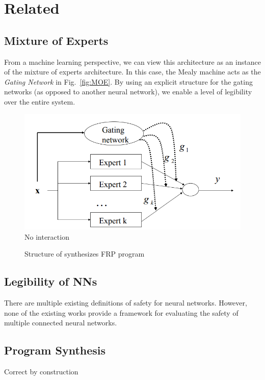 \section{Related}

\subsection{Mixture of Experts}

From a machine learning perspective, we can view this architecture as an instance of the mixture of experts architecture.
In this case, the Mealy machine acts as the \textit{Gating Network} in Fig.~\ref{fig:MOE}.
By using an explicit structure for the gating networks (as opposed to another neural network), we enable a level of legibility over the entire system.

\begin{figure}[h]  
\centering 
    \includegraphics[width=\linewidth]{MOE.png}
    \caption{No interaction} \label{fig:M1}  
\end{figure} 

\begin{figure}[h!]  
\centering 
  
\caption{Structure of synthesizes FRP program}
\end{figure} 




\subsection{Legibility of NNs}
There are multiple existing definitions of safety for neural networks.
However, none of the existing works provide a framework for evaluating the safety of multiple connected neural networks.

\subsection{Program Synthesis}
Correct by construction


